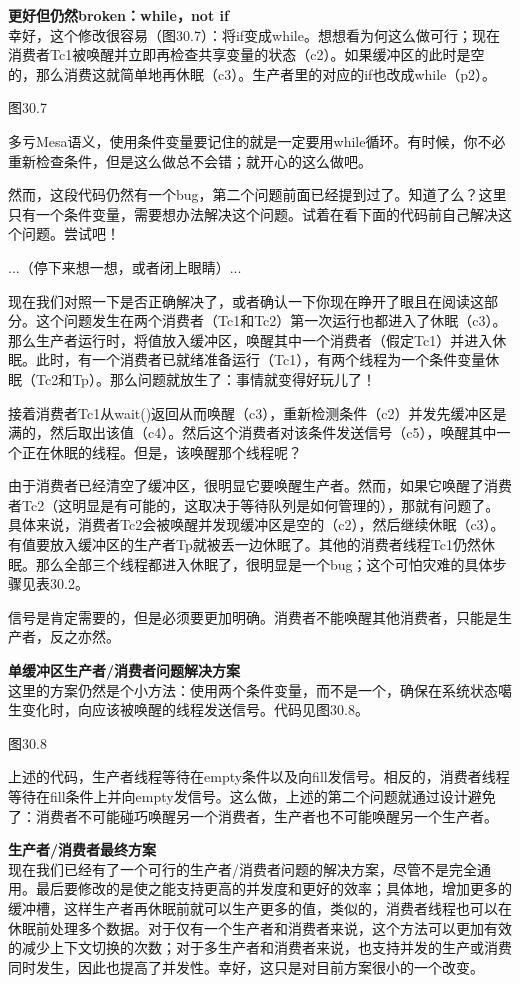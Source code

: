 \textbf{更好但仍然broken：while，not if}\\
幸好，这个修改很容易（图30.7）：将if变成while。想想看为何这么做可行；现在消费者Tc1被唤醒并立即再检查共享变量的状态（c2）。如果缓冲区的此时是空的，那么消费这就简单地再休眠（c3）。生产者里的对应的if也改成while（p2）。

图30.7

多亏Mesa语义，使用条件变量要记住的就是一定要用while循环。有时候，你不必重新检查条件，但是这么做总不会错；就开心的这么做吧。

然而，这段代码仍然有一个bug，第二个问题前面已经提到过了。知道了么？这里只有一个条件变量，需要想办法解决这个问题。试着在看下面的代码前自己解决这个问题。尝试吧！

...（停下来想一想，或者闭上眼睛）...

现在我们对照一下是否正确解决了，或者确认一下你现在睁开了眼且在阅读这部分。这个问题发生在两个消费者（Tc1和Tc2）第一次运行也都进入了休眠（c3）。那么生产者运行时，将值放入缓冲区，唤醒其中一个消费者（假定Tc1）并进入休眠。此时，有一个消费者已就绪准备运行（Tc1），有两个线程为一个条件变量休眠（Tc2和Tp）。那么问题就放生了：事情就变得好玩儿了！

接着消费者Tc1从wait()返回从而唤醒（c3），重新检测条件（c2）并发先缓冲区是满的，然后取出该值（c4）。然后这个消费者对该条件发送信号（c5），唤醒其中一个正在休眠的线程。但是，该唤醒那个线程呢？

由于消费者已经清空了缓冲区，很明显它要唤醒生产者。然而，如果它唤醒了消费者Tc2（这明显是有可能的，这取决于等待队列是如何管理的），那就有问题了。具体来说，消费者Tc2会被唤醒并发现缓冲区是空的（c2），然后继续休眠（c3）。有值要放入缓冲区的生产者Tp就被丢一边休眠了。其他的消费者线程Tc1仍然休眠。那么全部三个线程都进入休眠了，很明显是一个bug；这个可怕灾难的具体步骤见表30.2。

信号是肯定需要的，但是必须要更加明确。消费者不能唤醒其他消费者，只能是生产者，反之亦然。

\textbf{单缓冲区生产者/消费者问题解决方案}\\
这里的方案仍然是个小方法：使用两个条件变量，而不是一个，确保在系统状态噶生变化时，向应该被唤醒的线程发送信号。代码见图30.8。

图30.8

上述的代码，生产者线程等待在empty条件以及向fill发信号。相反的，消费者线程等待在fill条件上并向empty发信号。这么做，上述的第二个问题就通过设计避免了：消费者不可能碰巧唤醒另一个消费者，生产者也不可能唤醒另一个生产者。


\textbf{生产者/消费者最终方案}\\
现在我们已经有了一个可行的生产者/消费者问题的解决方案，尽管不是完全通用。最后要修改的是使之能支持更高的并发度和更好的效率；具体地，增加更多的缓冲槽，这样生产者再休眠前就可以生产更多的值，类似的，消费者线程也可以在休眠前处理多个数据。对于仅有一个生产者和消费者来说，这个方法可以更加有效的减少上下文切换的次数；对于多生产者和消费者来说，也支持并发的生产或消费同时发生，因此也提高了并发性。幸好，这只是对目前方案很小的一个改变。

